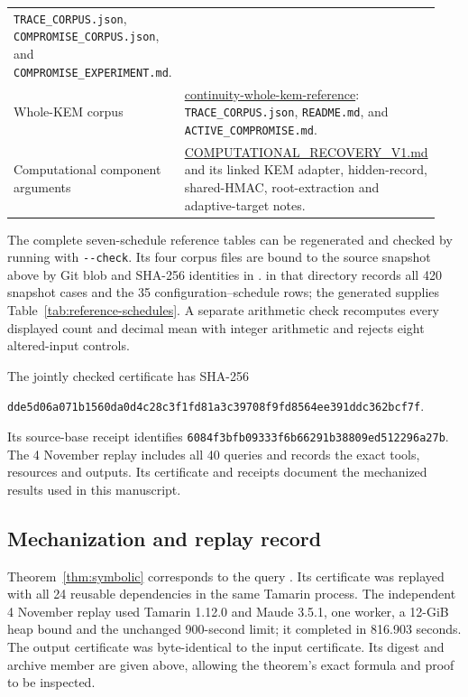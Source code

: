 \documentclass[pdflatex]{sn-jnl}
\theoremstyle{thmstyleone}
\theoremstyle{thmstylethree}
\theoremstyle{thmstyletwo}
\begin{document}
\begin{longtable}{@{}>{\raggedright\arraybackslash}p{0.25\linewidth}>{\raggedright\arraybackslash}p{0.69\linewidth}@{}}
\texttt{TRACE\_CORPUS.json}, \texttt{COMPROMISE\_CORPUS.json}, and
\texttt{COMPROMISE\_EXPERIMENT.md}.\\[5pt]
Whole-KEM corpus &
\href{https://github.com/billlza/q-periapt/tree/228c944fc476e3e57d6c08063cacb19bca5b360e/research/continuity-whole-kem-reference}{continuity-whole-kem-reference}:
\texttt{TRACE\_CORPUS.json}, \texttt{README.md}, and
\texttt{ACTIVE\_COMPROMISE.md}.\\[5pt]
Computational component arguments &
\href{https://github.com/billlza/q-periapt/blob/228c944fc476e3e57d6c08063cacb19bca5b360e/docs/continuity/COMPUTATIONAL_RECOVERY_V1.md}{COMPUTATIONAL\_RECOVERY\_V1.md}
and its linked KEM adapter, hidden-record, shared-HMAC,
root-extraction and adaptive-target notes.\\
\bottomrule
\end{longtable}

The complete seven-schedule reference tables can be regenerated and checked
by running
 with
\texttt{-{}-check}. Its four corpus files are bound to the source
snapshot above by Git blob and SHA-256 identities in
.
 in that directory records all 420 snapshot cases and
the 35 configuration--schedule rows; the generated
 supplies Table~\ref{tab:reference-schedules}.
A separate arithmetic check recomputes every displayed count and decimal mean
with integer arithmetic and rejects eight altered-input controls.

The jointly checked certificate has SHA-256
\begin{center}
\small\texttt{dde5d06a071b1560da0d4c28c3f1fd81a3c39708f9fd8564ee391ddc362bcf7f}.
\end{center}
Its source-base receipt identifies
\texttt{6084f3bfb09333f6b66291b38809ed512296a27b}.
The 4 November replay includes all 40 queries and records the exact tools,
resources and outputs. Its certificate and receipts document the
mechanized results used in this manuscript.



\subsection{Mechanization and replay record}

Theorem~\ref{thm:symbolic} corresponds to the query
.
Its certificate was replayed with all 24 reusable dependencies in the same
Tamarin process. The independent 4 November replay used Tamarin 1.12.0 and
Maude 3.5.1, one worker, a 12-GiB heap bound and the unchanged 900-second limit;
it completed in 816.903 seconds. The output certificate was byte-identical to
the input certificate. Its digest and archive member are given above,
allowing the theorem's exact formula and proof to be inspected.
\end{document}

